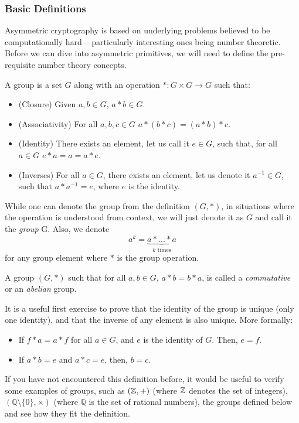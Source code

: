 \subsubsection{Basic Definitions}
Asymmetric cryptography is based on underlying problems believed to be computationally hard -- particularly interesting ones being number theoretic. Before we can dive into asymmetric primitives, we will need to define the pre-requisite number theory concepts. 

\begin{defn}[Group]
A group is a set $G$ along with an operation $*: G\times G\to G$ such that:
\begin{itemize}
\item (Closure) Given $a, b\in G$, $a*b\in G$.
\item (Associativity) For all $a, b, c \in G$ $a*(b*c) = (a*b)*c$.
\item (Identity) There exists an element, let us call it $e\in G$, such that, for all $a\in G$ $e*a = a = a*e$.
\item (Inverses) For all $a\in G$, there exists an element, let us denote it $a^{-1}\in G$, such that $a*a^{-1} = e$, where $e$ is the identity.
\end{itemize}
\end{defn} 

While one can denote the group from the definition $(G, *)$, in situations where the operation is understood from context, we will just denote it as $G$ and call it the \emph{group} G. Also, we denote 
\[
a^k = \underbrace{a* ...* a}_{\text{$k$ times}} 
\]
for any group element where $*$ is the group operation.

A group $(G, *)$ such that for all $a, b\in G$, $a*b = b*a$, is called a \emph{commutative} or an \emph{abelian} group.

\begin{remark}
It is a useful first exercise to prove that the identity of the group is unique (only one identity), and that the inverse of any element is also unique. More formally:
\begin{itemize}
\item If $f*a = a*f$ for all $a\in G$, and $e$ is the identity of $G$. Then, $e = f$.
\item If $a*b = e$ and $a*c = e$, then, $b = c$.
\end{itemize}
\end{remark}

If you have not encountered this definition before, it would be useful to verify some examples of groups, such as $({{\mathbb Z}}, +)$ (where ${{\mathbb Z}}$ denotes the set of integers), $(\mathbb{Q} \setminus \{0\}, \times)$ (where $\mathbb{Q}$ is the set of rational numbers), the groups defined below and see how they fit the definition.

